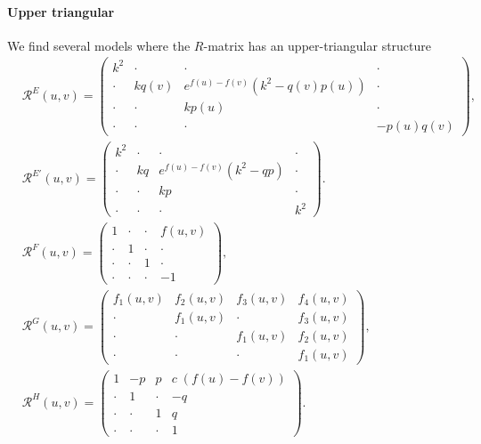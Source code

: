 \documentclass{article}
\begin{document}
\paragraph{Upper triangular}
We find several models where the $R$-matrix has an upper-triangular structure
\begin{align}
&   \mathcal{R}^E(u,v)=\begin{pmatrix}
        k^2&\cdot&\cdot&\cdot\\
        \cdot&k q(v)&e^{f(u)-f(v)}(k^2-q(v)p(u))&\cdot\\
        \cdot&\cdot&k p(u)&\cdot\\
        \cdot&\cdot&\cdot&-p(u)q(v)
    \end{pmatrix},
    \\
&  \mathcal{R}^{E'}(u,v)=\begin{pmatrix}
        k^2&\cdot&\cdot&\cdot\\
        \cdot&k q&e^{f(u)-f(v)}(k^2-qp)&\cdot\\
        \cdot&\cdot&k p&\cdot\\
        \cdot&\cdot&\cdot&k^2
    \end{pmatrix} .
\\
&   \mathcal{R}^F(u,v)= \begin{pmatrix}
        1&\cdot&\cdot&f(u,v)\\
        \cdot&1&\cdot&\cdot\\
        \cdot&\cdot&1&\cdot\\
        \cdot&\cdot&\cdot&-1
    \end{pmatrix},\\
   &
\mathcal{R}^G(u,v)=\begin{pmatrix}
        f_1(u,v)&f_2(u,v)&f_3(u,v)&f_4(u,v)\\
        \cdot&f_1(u,v)&\cdot&f_3(u,v)\\
        \cdot&\cdot&f_1(u,v)&f_2(u,v)\\
        \cdot&\cdot&\cdot&f_1(u,v)
    \end{pmatrix},\\
& \mathcal{R}^{H}(u,v)=\begin{pmatrix}
        1&-p&p&c\;(f(u)-f(v))\\
        \cdot&1&\cdot& -q  \\
        \cdot&\cdot&1&q\\
        \cdot&\cdot&\cdot&1
    \end{pmatrix} .
    \end{align}

 
\end{document}
